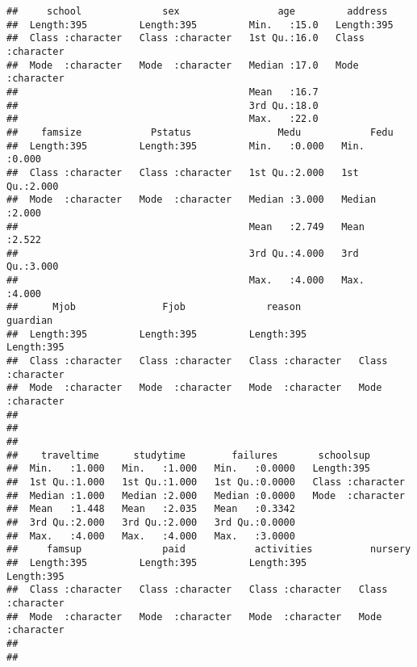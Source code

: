 \documentclass[
]{article}
\begin{document}
\begin{verbatim}
##     school              sex                 age         address         
##  Length:395         Length:395         Min.   :15.0   Length:395        
##  Class :character   Class :character   1st Qu.:16.0   Class :character  
##  Mode  :character   Mode  :character   Median :17.0   Mode  :character  
##                                        Mean   :16.7                     
##                                        3rd Qu.:18.0                     
##                                        Max.   :22.0                     
##    famsize            Pstatus               Medu            Fedu      
##  Length:395         Length:395         Min.   :0.000   Min.   :0.000  
##  Class :character   Class :character   1st Qu.:2.000   1st Qu.:2.000  
##  Mode  :character   Mode  :character   Median :3.000   Median :2.000  
##                                        Mean   :2.749   Mean   :2.522  
##                                        3rd Qu.:4.000   3rd Qu.:3.000  
##                                        Max.   :4.000   Max.   :4.000  
##      Mjob               Fjob              reason            guardian        
##  Length:395         Length:395         Length:395         Length:395        
##  Class :character   Class :character   Class :character   Class :character  
##  Mode  :character   Mode  :character   Mode  :character   Mode  :character  
##                                                                             
##                                                                             
##                                                                             
##    traveltime      studytime        failures       schoolsup        
##  Min.   :1.000   Min.   :1.000   Min.   :0.0000   Length:395        
##  1st Qu.:1.000   1st Qu.:1.000   1st Qu.:0.0000   Class :character  
##  Median :1.000   Median :2.000   Median :0.0000   Mode  :character  
##  Mean   :1.448   Mean   :2.035   Mean   :0.3342                     
##  3rd Qu.:2.000   3rd Qu.:2.000   3rd Qu.:0.0000                     
##  Max.   :4.000   Max.   :4.000   Max.   :3.0000                     
##     famsup              paid            activities          nursery         
##  Length:395         Length:395         Length:395         Length:395        
##  Class :character   Class :character   Class :character   Class :character  
##  Mode  :character   Mode  :character   Mode  :character   Mode  :character  
##                                                                             
##                                                                             

\end{verbatim}
\end{document}
